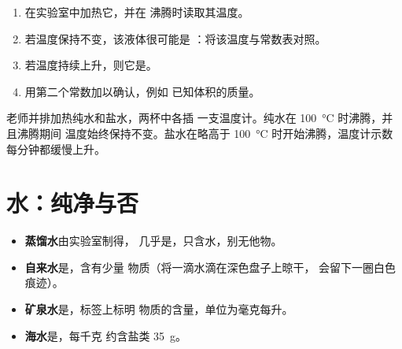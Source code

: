 \begin{method}\label{met:g6:pure-substances-and-mixtures:identify}
\begin{enumerate}
  \item 在实验室中加热它，并在
        沸腾时读取其温度。
  \item 若温度保持不变，该液体很可能是
        ：将该温度与常数表对照。
  \item 若温度持续上升，则它是。
  \item 用第二个常数加以确认，例如
        已知体积的质量。
\end{enumerate}
\end{method}

\begin{inthelab}[盐水的沸腾]
老师并排加热纯水和盐水，两杯中各插
一支温度计。纯水在 \qty{100}{\celsius} 时沸腾，并且沸腾期间
温度始终保持不变。盐水在略高于
\qty{100}{\celsius} 时开始沸腾，温度计示数
每分钟都缓慢上升。
\end{inthelab}

\section{水：纯净与否}

\begin{example}[四种水]\label{ex:g6:pure-substances-and-mixtures:waters}
\begin{itemize}
  \item \textbf{蒸馏水}由实验室制得，
        几乎是，只含水，别无他物。
  \item \textbf{自来水}是，含有少量
        物质（将一滴水滴在深色盘子上晾干，
        会留下一圈白色痕迹）。
  \item \textbf{矿泉水}是，标签上标明
        物质的含量，单位为毫克每升。
  \item \textbf{海水}是，每千克
        约含盐类 \qty{35}{g}。
\end{itemize}
\end{example}

